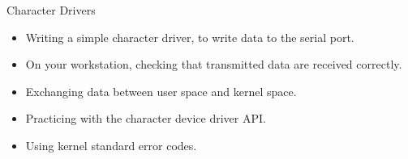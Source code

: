 \setuplabframe
{Character Drivers}
{
  \begin{itemize}
  \item Writing a simple character driver, to write data to the serial
    port.
  \item On your workstation, checking that transmitted data are
    received correctly.
  \item Exchanging data between user space and kernel space.
  \item Practicing with the character device driver API.
  \item Using kernel standard error codes.
  \end{itemize}
}
